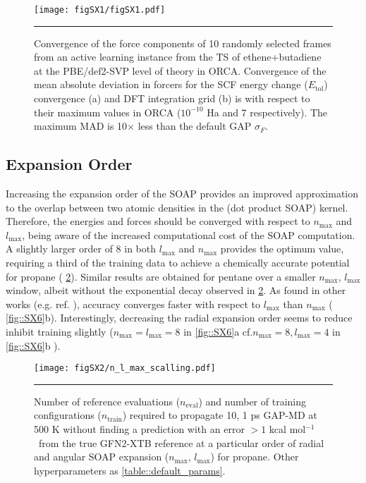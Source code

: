 \documentclass[11pt]{article}
\numberwithin{equation}{subsection}
\newcommand{\kcal}{kcal mol$^{-1}$}
\newcommand{\comment}[1]{}
\begin{document}
\begin{figure}[h!]
	\centering
	\vspace{0.4cm}
	\texttt{[image: figSX1/figSX1.pdf]}
	\vspace{0.1cm}
	\hrule
	\vspace{0.1cm}
	\caption{Convergence of the force components of 10 randomly selected frames from an active learning instance from the TS of ethene+butadiene at the PBE/def2-SVP level of theory in ORCA. Convergence of the mean absolute deviation in forcers for the SCF energy change ($E_\text{tol}$) convergence (a) and DFT integration grid (b) is with respect to their maximum values in ORCA ($10^{-10}$ Ha and 7 respectively). The maximum MAD is 10$\times$ less than the default GAP $\sigma_F$.}
	\label{fig::SX1}
\end{figure}


\subsection{Expansion Order}

Increasing the expansion order of the SOAP provides an improved approximation to the overlap between two atomic densities in the (dot product SOAP) kernel. Therefore, the energies and forces should be converged with respect to $n_\text{max}$ and $l_\text{max}$, being aware of the increased computational cost of the SOAP computation. A slightly larger order of 8 in both $l_\text{max}$ and $n_\text{max}$  provides the optimum value, requiring a third of the training data to achieve a chemically accurate potential for propane (\figurename{ \ref{fig::SX2}}). Similar results are obtained for pentane over a smaller $n_\text{max}$, $l_\text{max}$ window, albeit without the exponential decay observed in \figurename{ \ref{fig::SX2}}. As found in other works (e.g. ref. \cite{Rowe2020}), accuracy converges faster with respect to $l_\text{max}$ than $n_\text{max}$ (\figurename{ \ref{fig::SX6}}b). Interestingly, decreasing the radial expansion order seems to reduce inhibit training slightly ($n_\text{max} = l_\text{max} = 8$ in \figurename{ \ref{fig::SX6}a} cf.$n_\text{max} = 8, l_\text{max} = 4$ in \figurename{ \ref{fig::SX6}b} ).


\comment{
	TJW:  10x1 ps GAP-MD?
	TJW: Why is the graph for propane convex while pentane is concave?
}


\begin{figure}[h!]
	\centering
	\vspace{0.4cm}
	\texttt{[image: figSX2/n\_l\_max\_scalling.pdf]}
	\vspace{0.0cm}
	\hrule
	\vspace{0.1cm}
	\caption{Number of reference evaluations ($n_\text{eval}$) and number of training configurations ($n_\text{train}$) required to propagate 10, 1 ps  GAP-MD at 500 K without finding a prediction with an error $> 1$ \kcal~from the true GFN2-XTB reference at a particular order of radial and angular SOAP expansion ($n_\text{max},\, l_\text{max}$) for propane. Other hyperparameters as \tablename{ \ref{table::default_params}}.}
	\label{fig::SX2}
\end{figure}
\end{document}
